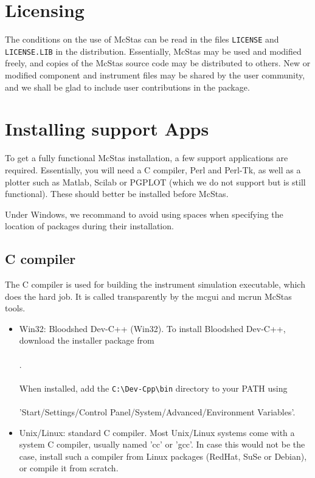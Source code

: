 \label{s:install}
\section{Licensing}
The conditions on the use of McStas can be read in the files
\verb+LICENSE+ and \verb+LICENSE.LIB+ in the distribution. Essentially,
McStas may be used and modified freely, and copies of the McStas source code
may be distributed to others.
New or modified component and instrument files may be shared by
the user community, and we shall be glad to include user contributions in the package.

\section{Installing support Apps}

To get a fully functional McStas installation, a few support applications are required. Essentially, you will need a C compiler, Perl and Perl-Tk, as well as a plotter such as Matlab, Scilab or PGPLOT (which we do not support but is still functional). These should better be installed before McStas.

Under Windows, we recommand to avoid using spaces when specifying the location of packages during their installation.

\subsection{C compiler}
\label{s:Ccompiler}

The C compiler is used for building the instrument simulation executable, which does the hard job. It is called transparently by the mcgui and mcrun McStas tools.

\begin{itemize}
\item{Win32: Bloodshed Dev-C++ (Win32).
  \label{s:instblood}
  To install Bloodshed Dev-C++, download the installer package from
  \\\
  \\.\\\
  \\
  When installed, add the \verb+C:\Dev-Cpp\bin+ directory to your PATH
  using\\\ \\
  'Start/Settings/Control Panel/System/Advanced/Environment Variables'.
}
\item{Unix/Linux: standard C compiler.
  Most Unix/Linux systems come with a system C compiler, usually named 'cc' or 'gcc'. In case this would not be the case, install such a compiler from Linux packages (RedHat, SuSe or Debian), or compile it from scratch.
}
\end{itemize}

